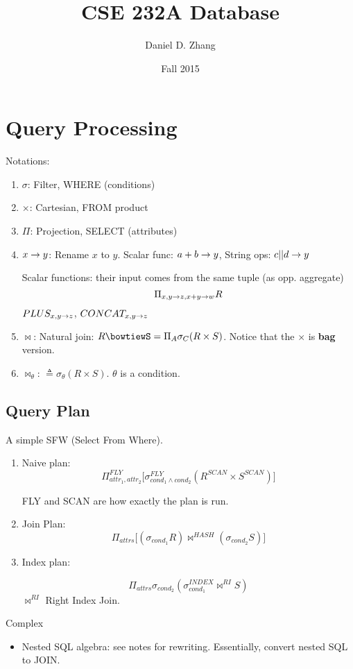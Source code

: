 \documentclass{article}
\begin{document}
\title{CSE 232A Database}
\author{Daniel D. Zhang}
\date{Fall 2015}
\maketitle


\tableofcontents
\section{Query Processing}
Notations:
\begin{enumerate}
\item $\sigma$: Filter, WHERE (conditions)
\item $\times$: Cartesian, FROM product 
\item $\Pi$: Projection, SELECT (attributes)
\item $x\rightarrow y$: Rename $x$ to $y$. Scalar func: $a+b\rightarrow y$, String ops: $c||d \rightarrow y$

Scalar functions: their input comes from the same tuple (as opp. aggregate)
$$
\Pi_{x, y\rightarrow z, x+y\rightarrow w} R
$$
$PLUS_{x, y\rightarrow z}$, $CONCAT_{x,y\rightarrow z}$
\item $\bowtie$: Natural join: $R\bowtiewS = \Pi_A\sigma_C(R\times S)$. Notice that the $\times$ is \textbf{bag} version. 
\item $\bowtie_{\theta}$: $\triangleq \sigma_{\theta} (R\times S)$. $\theta$ is a condition. 
\end{enumerate}
\subsection{Query Plan}
A simple SFW (Select From Where). 
\begin{enumerate}
\item Naive plan:
$$
\Pi_{attr_1,attr_2}^{FLY}\Big[\sigma_{cond_1\wedge cond_2}^{FLY} (R^{SCAN}\times S^{SCAN})\Big]
$$

FLY and SCAN are how exactly the plan is run. 

\item Join Plan:
$$
\Pi_{attrs} \Big[(\sigma_{cond_1}R)  \bowtie^{HASH} (\sigma_{cond_2}S) \Big]
$$
\item Index plan:

$$
\Pi_{attrs}\sigma_{cond_2}(\sigma_{cond_1}^{INDEX} \bowtie^{RI} S)
$$
$\bowtie^{RI}$ Right Index Join. 

\end{enumerate}
Complex
\begin{itemize}
\item Nested SQL algebra: see notes for rewriting. Essentially, convert nested SQL to JOIN.
\end{itemize}
\end{document}
